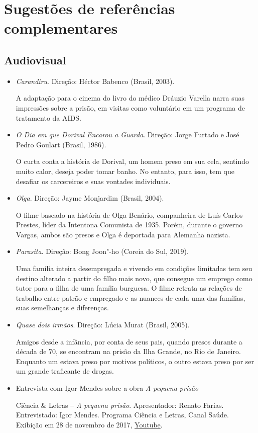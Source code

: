 \documentclass[11pt]{extarticle}
\begin{document}
\section{Sugestões de referências complementares}

\subsection{Audiovisual}

\begin{itemize}
\item\textit{Carandiru}. Direção: Héctor Babenco (Brasil, 2003).

A adaptação para o cinema do livro do médico Dráuzio Varella narra suas 
impressões sobre a prisão, em visitas como voluntário em um programa 
de tratamento da AIDS.

\item\textit{O Dia em que Dorival Encarou a Guarda}. Direção: Jorge Furtado e José Pedro Goulart (Brasil, 1986).

O curta conta a história de Dorival, um homem preso em sua cela, 
sentindo muito calor, deseja poder tomar banho. No entanto, 
para isso, tem que desafiar os carcereiros e suas vontades 
individuais.

\item\textit{Olga}. Direção: Jayme Monjardim (Brasil, 2004).

O filme baseado na história de Olga Benário, companheira de Luís 
Carlos Prestes, líder da Intentona Comunista de 1935. Porém, durante 
o governo Vargas, ambos são presos e Olga é deportada para Alemanha 
nazista.

\item\textit{Parasita}. Direção: Bong Joon"-ho (Coreia do Sul, 2019).

Uma família inteira desempregada e vivendo em condições limitadas tem 
seu destino alterado a partir do filho mais novo, que consegue um emprego 
como tutor para a filha de uma família burguesa. O filme retrata as relações 
de trabalho entre patrão e empregado e as nuances de cada uma das famílias, 
suas semelhanças e diferenças.

\item\textit{Quase dois irmãos}. Direção: Lúcia Murat (Brasil, 2005).

Amigos desde a infância, por conta de seus pais, quando presos durante 
a década de 70, se encontram na prisão da Ilha Grande, no Rio de Janeiro. 
Enquanto um estava preso por motivos políticos, o outro estava preso por 
ser um grande traficante de drogas.

\item Entrevista com Igor Mendes sobre a obra \emph{A pequena prisão}

Ciência \& Letras -- \emph{A
pequena prisão}. 
Apresentador: Renato Farias. Entrevistado: Igor Mendes. 
Programa Ciência e Letras, Canal Saúde. Exibição em 28 de novembro de 2017, \href{youtube.com/kwLs4aImRRM}{{Youtube}}.
\end{itemize}
\end{document}
